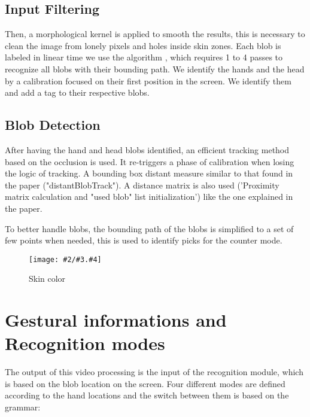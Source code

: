 \documentclass{llncs}
\newcommand\ignore[1]{}
\newcommand{\imagepathext}[5]{%
\begin{figure}[hbtp]
\hfil\texttt{[image: \#2/\#3.\#4]}\hfil
\caption{#5\label{#3}}
\end{figure}}
\newcommand{\png}[2]{\imagepathext{width=\columnwidth}{pics}{#1}{png}{#2}}
\begin{document}
\subsection{Input Filtering}
Then, a morphological kernel is applied to smooth the results, this is necessary
to clean the image from lonely pixels and holes inside skin zones.
Each blob is labeled in linear time we use the algorithm \cite{CompLabeling} , which requires 1 to 4 passes to recognize all blobs with their bounding path.
We identify the hands and the head by a calibration focused on their first position in the screen. We identify them and add a tag to their respective blobs.

\subsection{Blob Detection}
After having the hand and head blobs identified, an efficient tracking method based on the occlusion is used. It re-triggers a phase of calibration when losing the logic of tracking.
A bounding box distant measure similar to that found in the paper \cite{app06} ("distantBlobTrack"). A distance matrix is also used ('Proximity matrix calculation and "used blob" list initialization') like the one explained in the paper. 
\ignore{
When the matrix of distance is set up, there are some loops:
* A loop for detect inactive tracks: those tracks with no blobs near.
* Detect and create new tracks: those blobs without a track near.
* A loop to assign blobs to tracks. It makes clusters with blobs that are close and assign them to a track. In this step some tracks could merge in one.
* At the end, all inactive tracks are checked to delete the old ones.
}
To better handle blobs, the bounding path of the blobs is simplified to a set of few points when needed, this is used to identify picks for the counter mode.

\png{skincolor}{Skin color}

\ignore{
\section{Simplified gesture generation}
Using these blocks we are able to perturb
}

\section{Gestural informations and Recognition modes}
The output of this video processing is the input of the recognition module, which is based on the blob location on the screen. Four different modes are defined according to the hand locations and the switch between them is based on the grammar:
\end{document}
